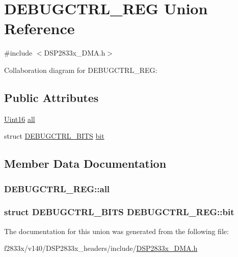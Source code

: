 \hypertarget{union_d_e_b_u_g_c_t_r_l___r_e_g}{}\section{D\+E\+B\+U\+G\+C\+T\+R\+L\+\_\+\+R\+E\+G Union Reference}
\label{union_d_e_b_u_g_c_t_r_l___r_e_g}


{\ttfamily \#include $<$D\+S\+P2833x\+\_\+\+D\+M\+A.\+h$>$}



Collaboration diagram for D\+E\+B\+U\+G\+C\+T\+R\+L\+\_\+\+R\+E\+G\+:
\subsection*{Public Attributes}
\begin{DoxyCompactItemize}
\item 
\hyperlink{_d_s_p2833x___device_8h_a59a9f6be4562c327cbfb4f7e8e18f08b}{Uint16} \hyperlink{union_d_e_b_u_g_c_t_r_l___r_e_g_a673f7b198dcd7652e17b974f9df986c6}{all}
\item 
struct \hyperlink{struct_d_e_b_u_g_c_t_r_l___b_i_t_s}{D\+E\+B\+U\+G\+C\+T\+R\+L\+\_\+\+B\+I\+T\+S} \hyperlink{union_d_e_b_u_g_c_t_r_l___r_e_g_a76ce998e07256d45bb49bf1b2ad9646d}{bit}
\end{DoxyCompactItemize}


\subsection{Member Data Documentation}
\hypertarget{union_d_e_b_u_g_c_t_r_l___r_e_g_a673f7b198dcd7652e17b974f9df986c6}{}
\subsubsection[{all}]{ D\+E\+B\+U\+G\+C\+T\+R\+L\+\_\+\+R\+E\+G\+::all}\label{union_d_e_b_u_g_c_t_r_l___r_e_g_a673f7b198dcd7652e17b974f9df986c6}
\hypertarget{union_d_e_b_u_g_c_t_r_l___r_e_g_a76ce998e07256d45bb49bf1b2ad9646d}{}
\subsubsection[{bit}]{\setlength{\rightskip}{0pt plus 5cm}struct {\bf D\+E\+B\+U\+G\+C\+T\+R\+L\+\_\+\+B\+I\+T\+S} D\+E\+B\+U\+G\+C\+T\+R\+L\+\_\+\+R\+E\+G\+::bit}\label{union_d_e_b_u_g_c_t_r_l___r_e_g_a76ce998e07256d45bb49bf1b2ad9646d}


The documentation for this union was generated from the following file\+:\begin{DoxyCompactItemize}
\item 
f2833x/v140/\+D\+S\+P2833x\+\_\+headers/include/\hyperlink{_d_s_p2833x___d_m_a_8h}{D\+S\+P2833x\+\_\+\+D\+M\+A.\+h}\end{DoxyCompactItemize}
